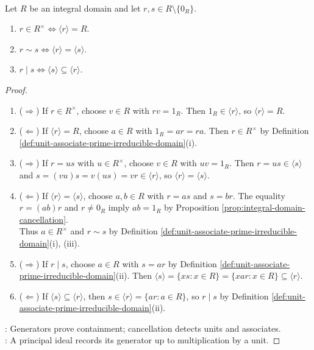 \begin{proposition} \label{prop:principal-ideals-divisibility-associates} \\
Let $R$ be an integral domain and let $r,s\in R\setminus\{0_R\}$.
\begin{enumerate}[label=(\roman*)]
\setlength{\itemsep}{0pt}
\item $r\in R^\times \Longleftrightarrow \langle r\rangle=R$.
\item $r\sim s \Longleftrightarrow \langle r\rangle=\langle s\rangle$.
\item $r\mid s \Longleftrightarrow \langle s\rangle\subseteq\langle r\rangle$.
\end{enumerate}
\begin{proof}
\begin{enumerate}[label=(\roman*)]
\setlength{\itemsep}{0pt}
\item[$(i)$] ($\Rightarrow$) If $r\in R^\times$, choose $v\in R$ with $rv=1_R$. Then $1_R\in\langle r\rangle$, so $\langle r\rangle=R$.
\item[$(i)$] ($\Leftarrow$) If $\langle r\rangle=R$, choose $a\in R$ with $1_R=ar=ra$. Then $r\in R^\times$ by Definition \ref{def:unit-associate-prime-irreducible-domain}(i).
\item[$(ii)$] ($\Rightarrow$) If $r=us$ with $u\in R^\times$, choose $v\in R$ with $uv=1_R$. Then $r=us\in\langle s\rangle$ and $s=(vu)s=v(us)=vr\in\langle r\rangle$, so $\langle r\rangle=\langle s\rangle$.
\item[$(ii)$] ($\Leftarrow$) If $\langle r\rangle=\langle s\rangle$, choose $a,b\in R$ with $r=as$ and $s=br$. The equality $r=(ab)r$ and $r\neq0_R$ imply $ab=1_R$ by Proposition \ref{prop:integral-domain-cancellation}.\\
Thus $a\in R^\times$ and $r\sim s$ by Definition \ref{def:unit-associate-prime-irreducible-domain}(i), (iii).
\item[$(iii)$] ($\Rightarrow$) If $r\mid s$, choose $a\in R$ with $s=ar$ by Definition \ref{def:unit-associate-prime-irreducible-domain}(ii). Then $\langle s\rangle=\{xs:x\in R\}=\{xar:x\in R\}\subseteq\langle r\rangle$.
\item[$(iii)$] ($\Leftarrow$) If $\langle s\rangle\subseteq\langle r\rangle$, then $s\in\langle r\rangle=\{ar:a\in R\}$, so $r\mid s$ by Definition \ref{def:unit-associate-prime-irreducible-domain}(ii).
\end{enumerate}
: Generators prove containment; cancellation detects units and associates.\\
: A principal ideal records its generator up to multiplication by a unit.
\end{proof}
\end{proposition}
